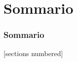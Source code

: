 \begin{frame}[plain]
    \maketitle
\end{frame}

\section{Sommario}
\begin{frame}[allowframebreaks]
    \frametitle{Sommario}
    [sections numbered]
    \tableofcontents
\end{frame}
\note{
}
